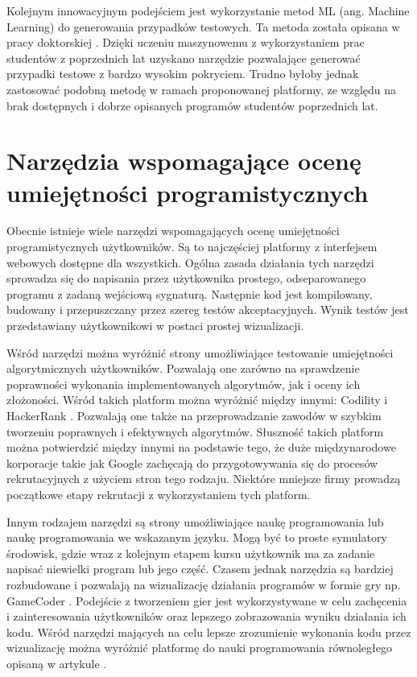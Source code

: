 Kolejnym innowacyjnym podejściem jest wykorzystanie metod ML (ang. Machine Learning) do generowania przypadków testowych. 
Ta metoda została opisana w pracy doktorskiej \cite{teach-testing-thesis}. 
Dzięki uczeniu maszynowemu z wykorzystaniem prac studentów z poprzednich lat uzyskano narzędzie pozwalające generować przypadki testowe z bardzo wysokim pokryciem.
Trudno byłoby jednak zastosować podobną metodę w ramach proponowanej platformy, ze względu na brak dostępnych i dobrze opisanych programów studentów poprzednich lat.



\section{Narzędzia wspomagające ocenę umiejętności programistycznych}
\label{tools}

Obecnie istnieje wiele narzędzi wspomagających ocenę umiejętności programistycznych użytkowników.
Są to najczęściej platformy z interfejsem webowych dostępne dla wszystkich.
Ogólna zasada działania tych narzędzi sprowadza się do napisania przez użytkownika prostego, odseparowanego programu z zadaną wejściową sygnaturą.
Następnie kod jest kompilowany, budowany i przepuszczany przez szereg testów akceptacyjnych.
Wynik testów jest przedstawiany użytkownikowi w postaci prostej wizualizacji.

Wśród narzędzi można wyróżnić strony umożliwiające testowanie umiejętności algorytmicznych użytkowników.
Pozwalają one zarówno na sprawdzenie poprawności wykonania implementowanych algorytmów, jak i oceny ich złożoności.
Wśród takich platform można wyróżnić między innymi: Codility \cite{codility} i HackerRank \cite{hacker-rank}. 
Pozwalają one także na przeprowadzanie zawodów w szybkim tworzeniu poprawnych i efektywnych algorytmów. 
Słuszność takich platform można potwierdzić między innymi na podstawie tego, że duże międzynarodowe korporacje takie jak Google zachęcają do przygotowywania się do procesów rekrutacyjnych z użyciem stron tego rodzaju. 
Niektóre mniejsze firmy prowadzą początkowe etapy rekrutacji z wykorzystaniem tych platform.

Innym rodzajem narzędzi są strony umożliwiające naukę programowania lub naukę programowania we wskazanym języku. 
Mogą być to proste symulatory środowisk, gdzie wraz z kolejnym etapem kursu użytkownik ma za zadanie napisać niewielki program lub jego część.
Czasem jednak narzędzia są bardziej rozbudowane i pozwalają na wizualizację działania programów w formie gry np. GameCoder \cite{game-coder}.
Podejście z tworzeniem gier jest wykorzystywane w celu zachęcenia i zainteresowania użytkowników oraz lepszego zobrazowania wyniku działania ich kodu.
Wśród narzędzi mających na celu lepsze zrozumienie wykonania kodu przez wizualizację można wyróżnić platformę do nauki programowania równoległego opisaną w artykule \cite{pharaller-platform}.


